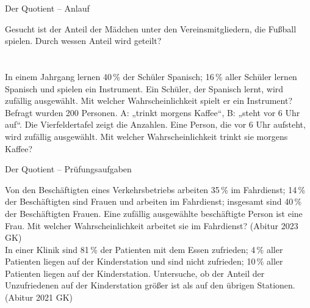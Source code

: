 \setcounter{aufgabe}{10}

\begin{aufgabe}{Der Quotient – Anlauf}
\begin{teile}
\teil Gesucht ist der Anteil der Mädchen unter den Vereinsmitgliedern, die Fußball spielen. Durch wessen Anteil wird geteilt? \\  \\  \\ 
\teil In einem Jahrgang lernen 40\,\% der Schüler Spanisch; 16\,\% aller Schüler lernen Spanisch und spielen ein Instrument. Ein Schüler, der Spanisch lernt, wird zufällig ausgewählt. Mit welcher Wahrscheinlichkeit spielt er ein Instrument? \leerfeld
\teil Befragt wurden 200 Personen. A: „trinkt morgens Kaffee“, B: „steht vor 6 Uhr auf“. Die Vierfeldertafel zeigt die Anzahlen. Eine Person, die vor 6 Uhr aufsteht, wird zufällig ausgewählt. Mit welcher Wahrscheinlichkeit trinkt sie morgens Kaffee?

\leerfeld
\end{teile}
\end{aufgabe}

\begin{aufgabe}{Der Quotient – Prüfungsaufgaben}
\begin{teile}
\teil Von den Beschäftigten eines Verkehrsbetriebs arbeiten 35\,\% im Fahrdienst; 14\,\% der Beschäftigten sind Frauen und arbeiten im Fahrdienst; insgesamt sind 40\,\% der Beschäftigten Frauen. Eine zufällig ausgewählte beschäftigte Person ist eine Frau. Mit welcher Wahrscheinlichkeit arbeitet sie im Fahrdienst? \hfill (Abitur 2023 GK) \\ \leerfeld
\teil In einer Klinik sind 81\,\% der Patienten mit dem Essen zufrieden; 4\,\% aller Patienten liegen auf der Kinderstation und sind nicht zufrieden; 10\,\% aller Patienten liegen auf der Kinderstation. Untersuche, ob der Anteil der Unzufriedenen auf der Kinderstation größer ist als auf den übrigen Stationen. \hfill (Abitur 2021 GK)
\end{teile}
\end{aufgabe}

